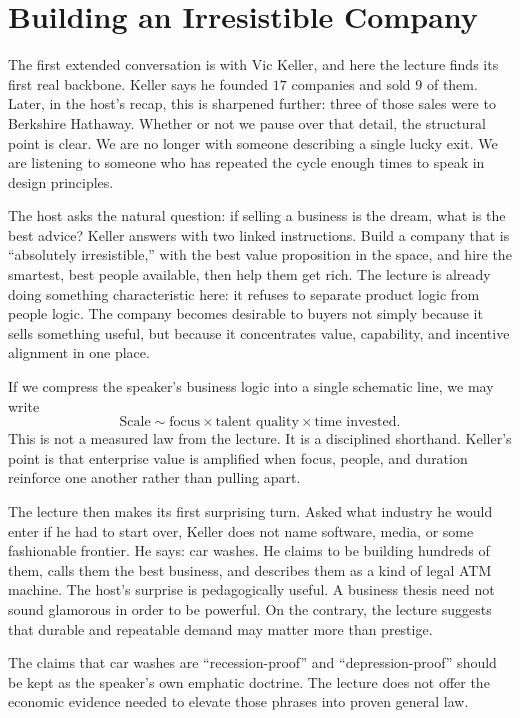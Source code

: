 \section{Building an Irresistible Company}

The first extended conversation is with Vic Keller, and here the lecture finds its first real backbone. Keller says he founded \(17\) companies and sold \(9\) of them. Later, in the host's recap, this is sharpened further: three of those sales were to Berkshire Hathaway. Whether or not we pause over that detail, the structural point is clear. We are no longer with someone describing a single lucky exit. We are listening to someone who has repeated the cycle enough times to speak in design principles.

The host asks the natural question: if selling a business is the dream, what is the best advice? Keller answers with two linked instructions. Build a company that is ``absolutely irresistible,'' with the best value proposition in the space, and hire the smartest, best people available, then help them get rich. The lecture is already doing something characteristic here: it refuses to separate product logic from people logic. The company becomes desirable to buyers not simply because it sells something useful, but because it concentrates value, capability, and incentive alignment in one place.

If we compress the speaker's business logic into a single schematic line, we may write
\begin{equation}
\text{Scale} \sim \text{focus} \times \text{talent quality} \times \text{time invested}.
\end{equation}
This is not a measured law from the lecture. It is a disciplined shorthand. Keller's point is that enterprise value is amplified when focus, people, and duration reinforce one another rather than pulling apart.

The lecture then makes its first surprising turn. Asked what industry he would enter if he had to start over, Keller does not name software, media, or some fashionable frontier. He says: car washes. He claims to be building hundreds of them, calls them the best business, and describes them as a kind of legal ATM machine. The host's surprise is pedagogically useful. A business thesis need not sound glamorous in order to be powerful. On the contrary, the lecture suggests that durable and repeatable demand may matter more than prestige.

\begin{remark}
The claims that car washes are ``recession-proof'' and ``depression-proof'' should be kept as the speaker's own emphatic doctrine. The lecture does not offer the economic evidence needed to elevate those phrases into proven general law.
\end{remark}

